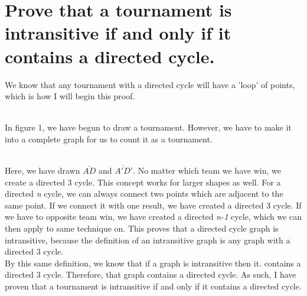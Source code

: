 \documentclass[11pt]{article} %
\begin{document}
\section*{Prove that a tournament is intransitive if and only if it contains a directed cycle.}
We know that any tournament with a directed cycle will have a 'loop' of points, which is how I will begin this proof.
\\
 \\
In figure 1, we have begun to draw a tournament. However, we have to make it into a complete graph for us to count it as a tournament.

\\
Here, we have drawn $\overline{AD}$ and $\overline{A'D'}$. No matter which team we have win, we create a directed 3 cycle. This concept works for larger shapes as well. For a directed \textit{n} cycle, we can always connect two points which are adjacent to the same point. If we connect it with one result, we have created a directed 3 cycle. If we have to opposite team win, we have created a directed \textit{n-1} cycle, which we can then apply to same technique on. This proves that a directed cycle graph is intransitive, because the definition of an intransitive graph is any graph with a directed 3 cycle. 
\\
By  this same definition, we know that if a graph is intransitive then it. contains a directed 3 cycle. Therefore, that graph contains a directed cycle. As such, I have proven that a tournament is intransitive if and only if it contains a directed cycle.
\end{document}
